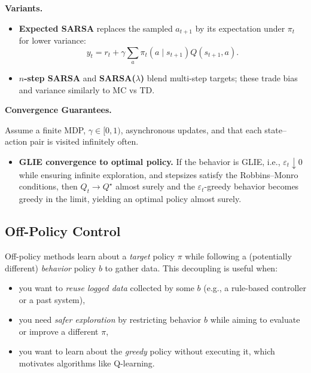 \documentclass[
]{book}
\providecommand{\tightlist}{%
  \setlength{\itemsep}{0pt}\setlength{\parskip}{0pt}}
\theoremstyle{definition}
\theoremstyle{definition}
\theoremstyle{definition}
\theoremstyle{definition}
\theoremstyle{remark}
\begin{document}
\textbf{Variants.}

\begin{itemize}
\item
  \textbf{Expected SARSA} replaces the sampled \(a_{t+1}\) by its expectation under \(\pi_t\) for lower variance:
  \begin{equation}
  y_t = r_{t} + \gamma \sum_a \pi_t(a\mid s_{t+1}) Q(s_{t+1}, a).
  \label{eq:ExpectedSARSA-Target}
  \end{equation}
\item
  \textbf{\(n\)-step SARSA} and \textbf{SARSA(\(\lambda\))} blend multi-step targets; these trade bias and variance similarly to MC vs TD.
\end{itemize}

\textbf{Convergence Guarantees.}

Assume a finite MDP, \(\gamma \in [0,1)\), asynchronous updates, and that each state--action pair is visited infinitely often.

\begin{itemize}
\tightlist
\item
  \textbf{GLIE convergence to optimal policy.} If the behavior is GLIE, i.e., \(\varepsilon_t \downarrow 0\) while ensuring infinite exploration, and stepsizes satisfy the Robbins--Monro conditions, then \(Q_t \to Q^\star\) almost surely and the \(\varepsilon_t\)-greedy behavior becomes greedy in the limit, yielding an optimal policy almost surely.
\end{itemize}

\subsection{Off-Policy Control}\label{off-policy-control}

Off-policy methods learn about a \emph{target} policy \(\pi\) while following a (potentially different) \emph{behavior} policy \(b\) to gather data. This decoupling is useful when:

\begin{itemize}
\item
  you want to \emph{reuse logged data} collected by some \(b\) (e.g., a rule-based controller or a past system),
\item
  you need \emph{safer exploration} by restricting behavior \(b\) while aiming to evaluate or improve a different \(\pi\),
\item
  you want to learn about the \emph{greedy} policy without executing it, which motivates algorithms like Q-learning.
\end{itemize}
\end{document}
